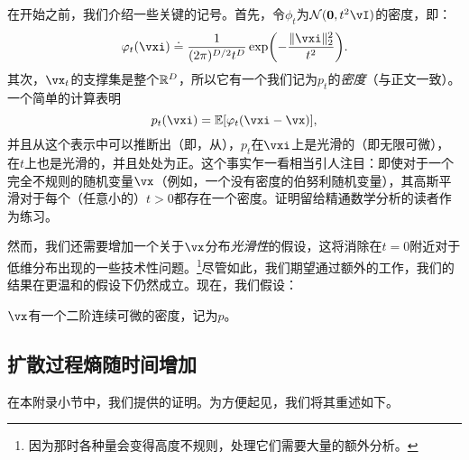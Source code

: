 \documentclass[../../book-main_zh.tex]{subfiles}
\begin{document}
在开始之前，我们介绍一些关键的记号。首先，令\(\phi_{t}\)为\(\dNorm(\vzero, t^{2}\vI)\)的密度，即：
\begin{equation}\label{eq:gaussian_noise_time_t}
    \phi_{t}(\vxi) \doteq \frac{1}{(2\pi)^{D/2}t^{D}}\exp\rp{-\frac{\norm{\vxi}_{2}^{2}}{t^{2}}}.
\end{equation}
其次，\(\vx_{t}\)的支撑集是整个\(\mathbb{R}^{D}\)，所以它有一个我们记为\(p_{t}\)的\textit{密度}（与正文一致）。一个简单的计算表明
\begin{equation}\label{eq:p_t_representation}
    p_{t}(\vxi) = \Ex[\phi_{t}(\vxi - \vx)],
\end{equation}
并且从这个表示中可以推断出（即，从），\(p_{t}\)在\(\vxi\)上是光滑的（即无限可微），在\(t\)上也是光滑的，并且处处为正。这个事实乍一看相当引人注目：即使对于一个完全不规则的随机变量\(\vx\)（例如，一个没有密度的伯努利随机变量），其高斯平滑对于每个（任意小的）\(t > 0\)都存在一个密度。证明留给精通数学分析的读者作为练习。

然而，我们还需要增加一个关于\(\vx\)分布\textit{光滑性}的假设，这将消除在\(t=0\)附近对于低维分布出现的一些技术性问题。\footnote{因为那时各种量会变得高度不规则，处理它们需要大量的额外分析。}尽管如此，我们期望通过额外的工作，我们的结果在更温和的假设下仍然成立。现在，我们假设：
\begin{assumption}\label{assumption:entropy_x_density}
    \(\vx\)有一个二阶连续可微的密度，记为\(p\)。
\end{assumption}


\subsection{扩散过程熵随时间增加}\label{sub:diffusion_entropy_increases}

在本附录小节中，我们提供的证明。为方便起见，我们将其重述如下。
\end{document}
